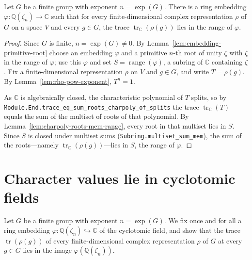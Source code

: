 \begin{theorem}
    \label{thm:brauer-character-in-cyclotomic}
    \leanok
    Let $G$ be a finite group with exponent $n = \exp(G)$. There is a ring
    embedding $\varphi : \mathbb{Q}(\zeta_n) \to \mathbb{C}$ such that for every
    finite-dimensional complex representation $\rho$ of $G$ on a space $V$ and
    every $g \in G$, the trace $\operatorname{tr}_{\mathbb{C}}(\rho(g))$ lies in
    the range of $\varphi$.
\end{theorem}
\begin{proof}
    Since $G$ is finite, $n = \exp(G) \neq 0$. By
    Lemma~\ref{lem:embedding-primitive-root} choose an embedding $\varphi$ and a
    primitive $n$-th root of unity $\zeta$ with $\zeta$ in the range of $\varphi$;
    use this $\varphi$ and set $S = \operatorname{range}(\varphi)$, a subring of
    $\mathbb{C}$ containing $\zeta$. Fix a finite-dimensional representation
    $\rho$ on $V$ and $g \in G$, and write $T = \rho(g)$. By
    Lemma~\ref{lem:rho-pow-exponent}, $T^n = 1$.

    As $\mathbb{C}$ is algebraically closed, the characteristic polynomial of $T$
    splits, so by \texttt{Module.End.trace\_eq\_sum\_roots\_charpoly\_of\_splits}
    the trace $\operatorname{tr}_{\mathbb{C}}(T)$ equals the sum of the multiset of
    roots of that polynomial. By Lemma~\ref{lem:charpoly-roots-mem-range}, every
    root in that multiset lies in $S$. Since $S$ is closed under multiset sums
    (\texttt{Subring.multiset\_sum\_mem}), the sum of the roots---namely
    $\operatorname{tr}_{\mathbb{C}}(\rho(g))$---lies in $S$, the range of
    $\varphi$.
\end{proof}





\section{Character values lie in cyclotomic fields}

Let $G$ be a finite group with exponent $n = \exp(G)$. We fix once and for all a
ring embedding $\varphi : \mathbb{Q}(\zeta_n) \hookrightarrow \mathbb{C}$ of the
cyclotomic field, and show that the trace $\operatorname{tr}(\rho(g))$ of every
finite-dimensional complex representation $\rho$ of $G$ at every $g \in G$ lies in
the image $\varphi(\mathbb{Q}(\zeta_n))$.

